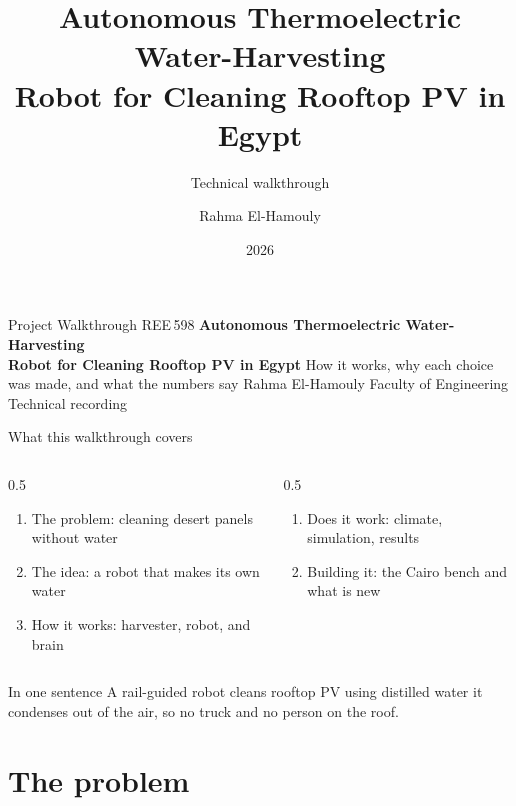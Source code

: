 \documentclass[aspectratio=169,10pt]{beamer}
\title[Self-Watering PV-Cleaning Robot]{Autonomous Thermoelectric Water-Harvesting\\Robot for Cleaning Rooftop PV in Egypt}
\subtitle{Technical walkthrough}
\author[R. El-Hamouly]{Rahma El-Hamouly}
\institute[REE598]{Graduation Project REE598 \\ Faculty of Engineering}
\date{2026}
\begin{document}
\nactitleframe
  {Project Walkthrough {\textbullet} REE\,598}
  {\bfseries Autonomous Thermoelectric Water-Harvesting\\[0.15em]Robot for Cleaning Rooftop PV in Egypt}
  {How it works, why each choice was made, and what the numbers say}
  {Rahma El-Hamouly}
  {Faculty of Engineering \quad{\textbullet}\quad Technical recording}

\begin{frame}{What this walkthrough covers}
  \begin{columns}[T]
    \begin{column}{0.5\textwidth}
      \begin{enumerate}\setlength\itemsep{0.5em}
        \item The problem: cleaning desert panels without water
        \item The idea: a robot that makes its own water
        \item How it works: harvester, robot, and brain
      \end{enumerate}
    \end{column}
    \begin{column}{0.5\textwidth}
      \begin{enumerate}\setlength\itemsep{0.5em}\setcounter{enumi}{3}
        \item Does it work: climate, simulation, results
        \item Building it: the Cairo bench and what is new
      \end{enumerate}
    \end{column}
  \end{columns}
  \vspace{0.7em}
  \begin{block}{In one sentence}
    A rail-guided robot cleans rooftop PV using distilled water it condenses out of the air, so no truck and no person on the roof.
  \end{block}
\end{frame}

\section{The problem}
\end{document}
